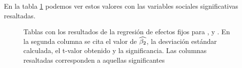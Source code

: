 En la tabla \ref{regresion_efectos_fijos_tabla} podemos ver estos valores con las variables sociales significativas resaltadas.




\begin{figure}

\caption{Tablas con los resultados de la regresión de efectos fijos para \ENGMAX, \FOMEAN y \NOISETOHARMONICS. En la segunda columna se cita el valor de $\widehat{\beta_2}$, la desviación estándar calculada, el t-valor obtenido y la significancia. Las columnas resaltadas corresponden a aquellas significantes}\label{regresion_efectos_fijos_tabla}
\end{figure}
